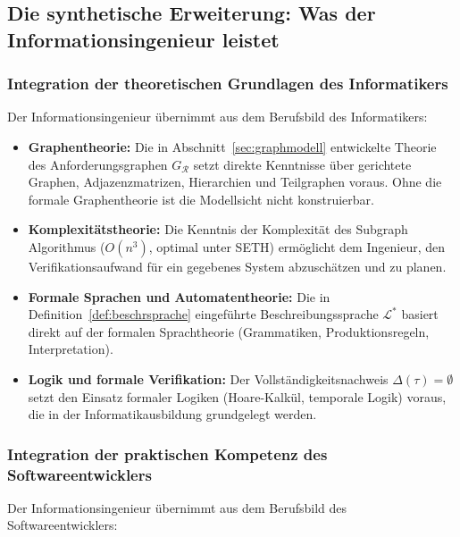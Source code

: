 ﻿\documentclass[a4paper,12pt]{article}
\theoremstyle{definition}
\begin{document}
\subsection{Die synthetische Erweiterung: Was der Informationsingenieur leistet}

\subsubsection{Integration der theoretischen Grundlagen des Informatikers}

Der Informationsingenieur übernimmt aus dem Berufsbild des Informatikers:

\begin{itemize}
  \item \textbf{Graphentheorie:} Die in Abschnitt~\ref{sec:graphmodell} entwickelte
        Theorie des Anforderungsgraphen $G_\mathcal{R}$ setzt direkte Kenntnisse
        über gerichtete Graphen, Adjazenzmatrizen, Hierarchien und Teilgraphen voraus.
        Ohne die formale Graphentheorie ist die Modellsicht nicht konstruierbar.
  \item \textbf{Komplexitätstheorie:} Die Kenntnis der Komplexität des Subgraph Algorithmus
        ($O(n^3)$, optimal unter SETH) ermöglicht dem Ingenieur, den Verifikationsaufwand
        für ein gegebenes System abzuschätzen und zu planen.
  \item \textbf{Formale Sprachen und Automatentheorie:}
        Die in Definition~\ref{def:beschrsprache} eingeführte Beschreibungssprache
        $\mathcal{L}^*$ basiert direkt auf der formalen Sprachtheorie
        (Grammatiken, Produktionsregeln, Interpretation).
  \item \textbf{Logik und formale Verifikation:}
        Der Vollständigkeitsnachweis $\Delta(\tau) = \emptyset$ setzt den Einsatz
        formaler Logiken (Hoare-Kalkül, temporale Logik) voraus, die in der
        Informatikausbildung grundgelegt werden.
\end{itemize}

\subsubsection{Integration der praktischen Kompetenz des Softwareentwicklers}

Der Informationsingenieur übernimmt aus dem Berufsbild des Softwareentwicklers:
\end{document}
